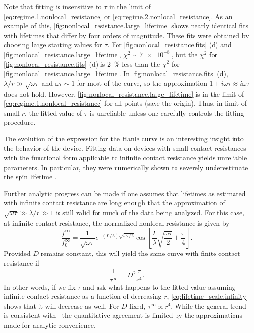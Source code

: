 Note that fitting is insensitive to $τ$ in the limit of
\cref{eq:regime.1.nonlocal_resistance}
or \cref{eq:regime.2.nonlocal_resistance}.
As an example of this,
\cref{fig:nonlocal_resistance.large_lifetime} shows nearly identical fits
with lifetimes that differ by four orders of magnitude.
These fits were obtained by choosing large starting values for $τ$.
For \cref{fig:nonlocal_resistance.fits} (d)
and \cref{fig:nonlocal_resistance.large_lifetime},
$χ^2 ∼ \SI{7e-8}{}$, but the $χ^2$ for
\cref{fig:nonlocal_resistance.fits} (d)
is \SI{2}{\percent} less than the $χ^2$ for
\cref{fig:nonlocal_resistance.large_lifetime}.
In \cref{fig:nonlocal_resistance.fits} (d),
$λ / r ≫ \sqrt{ω τ}$ and $ω τ ∼ 1$ for most of the curve,
so the approximation $1 + i ω τ ≈ i ω τ$ does not hold.
However, \cref{fig:nonlocal_resistance.large_lifetime}
is in the limit of \cref{eq:regime.1.nonlocal_resistance}
for all points (save the origin).
Thus, in limit of small $r$, the fitted value of $τ$ is unreliable
unless one carefully controls the fitting procedure.

The evolution of the expression for the Hanle curve
is an interesting insight into the behavior of the device.
Fitting data on devices with small contact resistances
with the functional form applicable to infinite contact resistance
yields unreliable parameters.
In particular, they were numerically shown
to severely underestimate the spin lifetime
\cite{PhysRevB.86.235408}.

Further analytic progress can be made if one assumes that
lifetimes as estimated with infinite contact resistance are long
enough that the approximation of $\sqrt{ω τ} ≫ λ / r ≫ 1$
is still valid for much of the data being analyzed.
For this case, at infinite contact resistance,
the normalized nonlocal resistance is given by
\begin{equation}
  \frac{f^∞}{f^∞_0} = \frac{1}{ \sqrt{ω τ}}
                      e^{- \left( L / λ \right) \sqrt{ω τ / 2}}
                      \cos{\left[ \frac{L}{λ} \sqrt{\frac{ω τ}{2}} + \frac{π}{4} \right]} .
\end{equation}
Provided $D$ remains constant,
this will yield the same curve with finite contact resistance if
\begin{equation}
  \label{eq:lifetime_scale.infinity}
  \frac{1}{τ^∞} = D^2 \frac{τ}{r^4} .
\end{equation}
In other words, if we fix $τ$ and ask what happens to the fitted value
assuming infinite contact resistance as a function of decreasing $r$,
\cref{eq:lifetime_scale.infinity} shows that it will decrease as well.
For $D$ fixed, $τ^∞ ∝ r^4$.
While the general trend is consistent with
\cite{PhysRevB.86.235408},
the quantitative agreement is limited by
the approximations made for analytic convenience.
